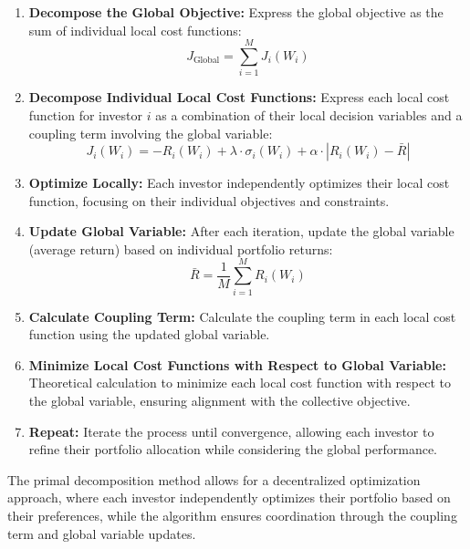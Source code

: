 \documentclass{article}
\begin{document}
	\begin{enumerate}
		\item \textbf{Decompose the Global Objective:} Express the global objective as the sum of individual local cost functions:
		\[ J_{\text{Global}} = \sum_{i=1}^{M} J_i(W_i) \]
		
		\item \textbf{Decompose Individual Local Cost Functions:} Express each local cost function for investor $i$ as a combination of their local decision variables and a coupling term involving the global variable:
		\[ J_i(W_i) = -R_i(W_i) + \lambda \cdot \sigma_i(W_i) + \alpha \cdot |R_i(W_i) - \bar{R}| \]
		
		\item \textbf{Optimize Locally:} Each investor independently optimizes their local cost function, focusing on their individual objectives and constraints.
		
		\item \textbf{Update Global Variable:} After each iteration, update the global variable (average return) based on individual portfolio returns:
		\[ \bar{R} = \frac{1}{M} \sum_{i=1}^{M} R_i(W_i) \]
		
		\item \textbf{Calculate Coupling Term:} Calculate the coupling term in each local cost function using the updated global variable.
		
		\item \textbf{Minimize Local Cost Functions with Respect to Global Variable:} Theoretical calculation to minimize each local cost function with respect to the global variable, ensuring alignment with the collective objective.
		
		\item \textbf{Repeat:} Iterate the process until convergence, allowing each investor to refine their portfolio allocation while considering the global performance.
	\end{enumerate}
	
	The primal decomposition method allows for a decentralized optimization approach, where each investor independently optimizes their portfolio based on their preferences, while the algorithm ensures coordination through the coupling term and global variable updates.
	
\end{document}
